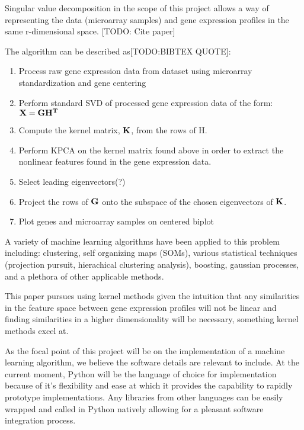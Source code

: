 \documentclass[10pt,a4,oneside]{report}
\begin{document}
Singular value decomposition in the scope of this project allows a way of representing the data (microarray samples) and gene expression profiles in the same r-dimensional space. [TODO: Cite paper]



The algorithm can be described as[TODO:BIBTEX QUOTE]: %

\begin{enumerate}  \itemsep -2pt %
\item
Process raw gene expression data from dataset using microarray standardization and gene centering
\item 
Perform standard SVD of processed gene expression data of the form: $\bf{X} = \bf{G}\bf{H}^{T}$
\item
Compute the kernel matrix, $\bf{K}$, from  the rows of H.
\item
Perform KPCA on the kernel matrix found above in order to extract the nonlinear features found in the gene expression data.
\item
Select leading eigenvectors(?)
\item
Project the rows of $\bf{G}$ onto the subspace of the chosen eigenvectors of $\bf{K}$.
\item
Plot genes and microarray samples on centered biplot
\end{enumerate}

A variety of machine learning algorithms have been applied to this problem including:
clustering, self organizing maps (SOMs), various statistical techniques (projection pursuit, hierachical clustering analysis),
boosting, gaussian processes, and a plethora of other applicable methods.

This paper pursues using kernel methods  given the intuition that any similarities in the feature space between gene expression
profiles will not be linear and finding similarities in a higher dimensionality will be necessary, something kernel methods excel at.

As the focal point of this project will be on the implementation of a machine learning algorithm, we believe the software details are relevant to include.
At the current moment, Python will be the language of choice for implementation because of it's flexibility and ease at which it provides the capability
to rapidly prototype implementations. Any libraries from other languages can be easily wrapped and called in Python natively allowing for a pleasant
software integration process.
\end{document}
